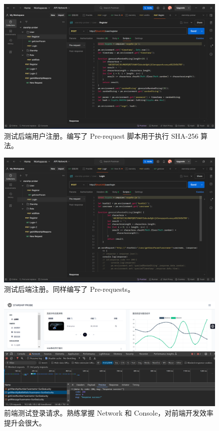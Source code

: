 \documentclass{base}
\begin{document}
\begin{figure}[H]
	\centering
	\includegraphics[width=\linewidth]{images/TestUserLogin}
	\caption{测试后端用户注册。编写了 Pre-request 脚本用于执行 SHA-256 算法。}
	\label{fig:testuserlogin}
\end{figure}

\begin{figure}[H]
	\centering
	\includegraphics[width=\linewidth]{images/TestUserRegister}
	\caption{测试后端注册。同样编写了 Pre-requests。}
	\label{fig:testuserregister}
\end{figure}

\begin{figure}[H]
	\centering
	\includegraphics[width=\linewidth]{images/TestUserLoginFrontEnd}
	\caption{前端测试登录请求。熟练掌握 Network 和 Console，对前端开发效率提升会很大。}
	\label{fig:testuserloginfrontend}
\end{figure}
\end{document}
